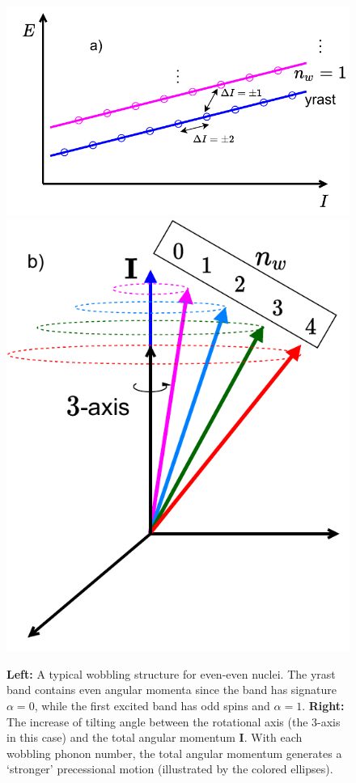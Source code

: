 \begin{figure}
    \centering
    \includegraphics[scale=0.72]{Chapters/Figures/wobbling_n_schematic-1.pdf}
    \includegraphics[scale=0.6]{Chapters/Figures/wobbling_n_schematic-2.pdf}
    \caption{\textbf{Left:} A typical wobbling structure for even-even nuclei. The yrast band contains even angular momenta since the band has signature $\alpha=0$, while the first excited band has odd spins and $\alpha=1$. \textbf{Right:} The increase of tilting angle between the rotational axis (the $3$-axis in this case) and the total angular momentum $\mathbf{I}$. With each wobbling phonon number, the total angular momentum generates a `stronger' precessional motion (illustrated by the colored ellipses).}
    \label{wobbling-geometry-tilting-sketch}    
\end{figure}

